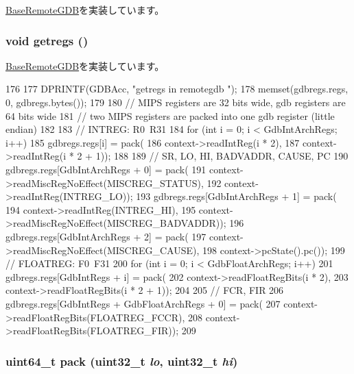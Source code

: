 \hyperlink{classBaseRemoteGDB_aca04756a764f2ef2add9ee91be012659}{BaseRemoteGDB}を実装しています。\hypertarget{classMipsISA_1_1RemoteGDB_a62bc8adc5a48f1cbb5eb9bb64301d38d}{
\subsubsection[{getregs}]{\setlength{\rightskip}{0pt plus 5cm}void getregs ()}}
\label{classMipsISA_1_1RemoteGDB_a62bc8adc5a48f1cbb5eb9bb64301d38d}


\hyperlink{classBaseRemoteGDB_aca04756a764f2ef2add9ee91be012659}{BaseRemoteGDB}を実装しています。


\begin{DoxyCode}
176 {
177     DPRINTF(GDBAcc, "getregs in remotegdb \n");
178     memset(gdbregs.regs, 0, gdbregs.bytes());
179 
180     // MIPS registers are 32 bits wide, gdb registers are 64 bits wide
181     // two MIPS registers are packed into one gdb register (little endian)
182 
183     // INTREG: R0~R31
184     for (int i = 0; i < GdbIntArchRegs; i++) {
185         gdbregs.regs[i] = pack(
186                 context->readIntReg(i * 2),
187                 context->readIntReg(i * 2 + 1));
188     }
189     // SR, LO, HI, BADVADDR, CAUSE, PC
190     gdbregs.regs[GdbIntArchRegs + 0] = pack(
191                 context->readMiscRegNoEffect(MISCREG_STATUS),
192                 context->readIntReg(INTREG_LO));
193     gdbregs.regs[GdbIntArchRegs + 1] = pack(
194                 context->readIntReg(INTREG_HI),
195                 context->readMiscRegNoEffect(MISCREG_BADVADDR));
196     gdbregs.regs[GdbIntArchRegs + 2] = pack(
197                 context->readMiscRegNoEffect(MISCREG_CAUSE),
198                 context->pcState().pc());
199     // FLOATREG: F0~F31
200     for (int i = 0; i < GdbFloatArchRegs; i++) {
201         gdbregs.regs[GdbIntRegs + i] = pack(
202                 context->readFloatRegBits(i * 2),
203                 context->readFloatRegBits(i * 2 + 1));
204     }
205     // FCR, FIR
206     gdbregs.regs[GdbIntRegs + GdbFloatArchRegs + 0] = pack(
207                 context->readFloatRegBits(FLOATREG_FCCR),
208                 context->readFloatRegBits(FLOATREG_FIR));
209 }
\end{DoxyCode}
\hypertarget{classMipsISA_1_1RemoteGDB_ab949ca65737c1211d9722edae7e87391}{
\subsubsection[{pack}]{\setlength{\rightskip}{0pt plus 5cm}uint64\_\-t pack ({\bf uint32\_\-t} {\em lo}, \/  {\bf uint32\_\-t} {\em hi})}}
\label{classMipsISA_1_1RemoteGDB_ab949ca65737c1211d9722edae7e87391}



